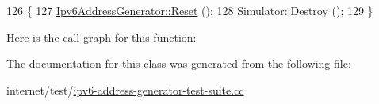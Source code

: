 \begin{DoxyCode}
126 \{
127   \hyperlink{group__config_ga2c1b65724f42f8c72276d7e7ad6df6db}{Ipv6AddressGenerator::Reset} ();
128   Simulator::Destroy ();
129 \}
\end{DoxyCode}


Here is the call graph for this function\+:




The documentation for this class was generated from the following file\+:\begin{DoxyCompactItemize}
\item 
internet/test/\hyperlink{ipv6-address-generator-test-suite_8cc}{ipv6-\/address-\/generator-\/test-\/suite.\+cc}\end{DoxyCompactItemize}
